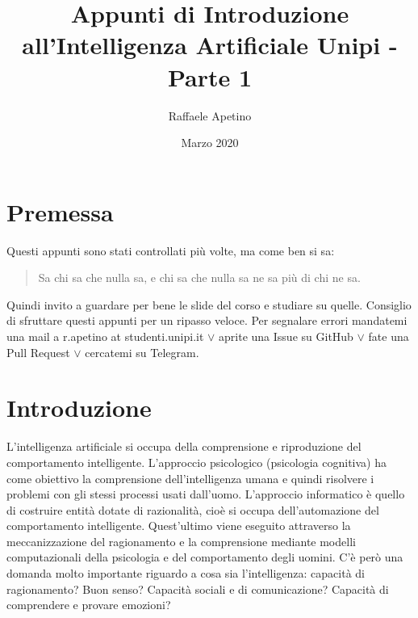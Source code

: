 \documentclass{article}
\title{Appunti di Introduzione all'Intelligenza Artificiale Unipi - Parte 1}
\author{Raffaele Apetino}
\date{Marzo 2020}
\begin{document}
\maketitle

\tableofcontents{}
\clearpage
\section{Premessa}
Questi appunti sono stati controllati più volte, ma come ben si sa:
\begin{quote}
    Sa chi sa che nulla sa, e chi sa che nulla sa ne sa più di chi ne sa.
\end{quote}
Quindi invito a guardare per bene le slide del corso e studiare su quelle. Consiglio di sfruttare questi appunti per un ripasso veloce. Per segnalare errori mandatemi una mail a r.apetino at studenti.unipi.it $\lor$ aprite una Issue su GitHub $\lor$ fate una Pull Request $\lor$ cercatemi su Telegram.

\section{Introduzione}
L'intelligenza artificiale si occupa della comprensione e riproduzione del comportamento intelligente.
L'approccio psicologico (psicologia cognitiva) ha come obiettivo la comprensione dell'intelligenza umana e quindi risolvere i problemi con gli stessi processi usati dall'uomo.
L'approccio informatico è quello di costruire entità dotate di razionalità, cioè si occupa dell'automazione del comportamento intelligente. 
Quest'ultimo viene eseguito attraverso la meccanizzazione del ragionamento e la comprensione mediante modelli computazionali della psicologia e del comportamento degli uomini. \newline 
C'è però una domanda molto importante riguardo a cosa sia l'intelligenza: capacità di ragionamento? Buon senso? Capacità sociali e di comunicazione? Capacità di comprendere e provare emozioni?
\end{document}
